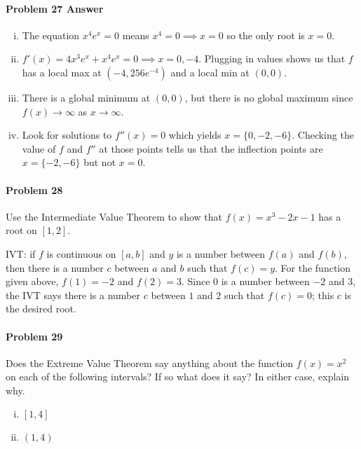 \documentclass[a4paper, 11pt]{article}
\begin{document}

\paragraph{Problem 27 Answer}
\begin{enumerate}[(i)]
	\item The equation $x^4e^x=0$ means $x^4=0 \implies x=0$ so the only root is $x=0$.
	\item $f'(x) = 4x^3 e^x + x^4 e^x = 0 \implies x = 0,-4$.  Plugging in values shows us that $f$ has a local max at $(-4, 256e^{-4})$ and a local min at $(0,0)$.
	\item There is a global minimum at $(0,0)$, but there is no global maximum since $f(x)\rightarrow \infty$ as $x\rightarrow \infty$.
	\item Look for solutions to $f''(x) = 0$ which yields $x=\{0,-2,-6\}$.  Checking the value of $f$ and $f''$ at those points tells us that the inflection points are $x=\{-2,-6\}$ but not $x=0$.
\end{enumerate}


\paragraph{Problem 28}
Use the Intermediate Value Theorem to show that $f(x) = x^3 - 2x - 1$ has a root on $[1,2]$.


IVT: if $f$ is continuous on $[a,b]$ and $y$ is a number between $f(a)$ and $f(b)$, then there is a number $c$ between $a$ and $b$ such that $f(c)=y$.
For the function given above, $f(1)=-2$ and $f(2)=3$.
Since $0$ is a number between $-2$ and $3$, the IVT says there is a number $c$ between $1$ and $2$ such that $f(c)=0$; this $c$ is the desired root.


\paragraph{Problem 29}
Does the Extreme Value Theorem say anything about the function $f(x) = x^2$ on each of the following intervals? If so what does it say?  In either case, explain why.
\begin{enumerate}[(i)]
	\item $[1,4]$
	\item $(1,4)$
\end{enumerate}
\end{document}
